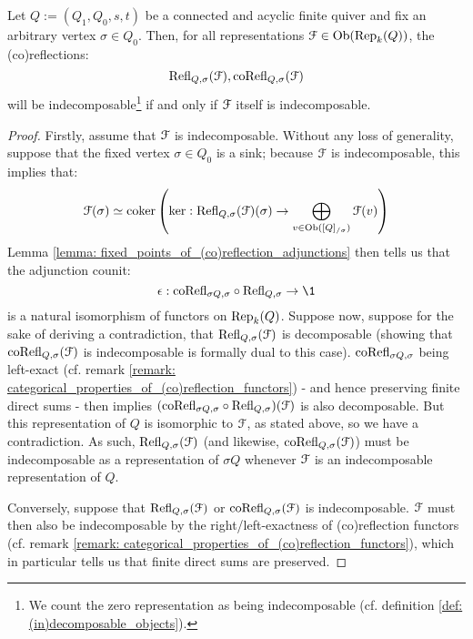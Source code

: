             \begin{lemma} \label{lemma: (co)reflections_of_indecomposable_representations}
                Let $Q := (Q_1, Q_0, s, t)$ be a connected and acyclic finite quiver and fix an arbitrary vertex $\sigma \in Q_0$. Then, for all representations $\mathcal{F} \in \mathrm{Ob}(\mathrm{Rep}_k(Q))$, the (co)reflections:
                    $$\mathrm{Refl}_{Q, \sigma}(\mathcal{F}), \mathrm{co}\mathrm{Refl}_{Q, \sigma}(\mathcal{F})$$
                will be indecomposable\footnote{We count the zero representation as being indecomposable (cf. definition \ref{def: (in)decomposable_objects}).} if and only if $\mathcal{F}$ itself is indecomposable.
            \end{lemma}
                \begin{proof}
                    Firstly, assume that $\mathcal{F}$ is indecomposable. Without any loss of generality, suppose that the fixed vertex $\sigma \in Q_0$ is a sink; because $\mathcal{F}$ is indecomposable, this implies that:
                        $$\mathcal{F}(\sigma) \simeq \operatorname{coker} \left( \ker: \mathrm{Refl}_{Q, \sigma}(\mathcal{F})(\sigma) \to \bigoplus_{v \in \mathrm{Ob}([Q]_{/\sigma})} \mathcal{F}(v) \right)$$
                    Lemma \ref{lemma: fixed_points_of_(co)reflection_adjunctions} then tells us that the adjunction counit:
                        $$\e: \co\Refl_{\sigma Q, \sigma} \circ \Refl_{Q, \sigma} \to \1$$
                    is a natural isomorphism of functors on $\mathrm{Rep}_k(Q)$. Suppose now, suppose for the sake of deriving a contradiction, that $\mathrm{Refl}_{Q, \sigma}(\mathcal{F})$ is decomposable (showing that $\mathrm{co}\mathrm{Refl}_{Q, \sigma}(\mathcal{F})$ is indecomposable is formally dual to this case). $\mathrm{co}\mathrm{Refl}_{\sigma Q, \sigma}$ being left-exact (cf. remark \ref{remark: categorical_properties_of_(co)reflection_functors}) - and hence preserving finite direct sums - then implies $(\mathrm{co}\mathrm{Refl}_{\sigma Q, \sigma} \circ \mathrm{Refl}_{Q, \sigma})(\mathcal{F})$ is also decomposable. But this representation of $Q$ is isomorphic to $\mathcal{F}$, as stated above, so we have a contradiction. As such, $\mathrm{Refl}_{Q, \sigma}(\mathcal{F})$ (and likewise, $\mathrm{co}\mathrm{Refl}_{Q, \sigma}(\mathcal{F})$) must be indecomposable as a representation of $\sigma Q$ whenever $\mathcal{F}$ is an indecomposable representation of $Q$.
                    
                    Conversely, suppose that $\mathrm{Refl}_{Q, \sigma}(\mathcal{F})$ or $\mathrm{co}\mathrm{Refl}_{Q, \sigma}(\mathcal{F})$ is indecomposable. $\mathcal{F}$ must then also be indecomposable by the right/left-exactness of (co)reflection functors (cf. remark \ref{remark: categorical_properties_of_(co)reflection_functors}), which in particular tells us that finite direct sums are preserved.
                \end{proof}
